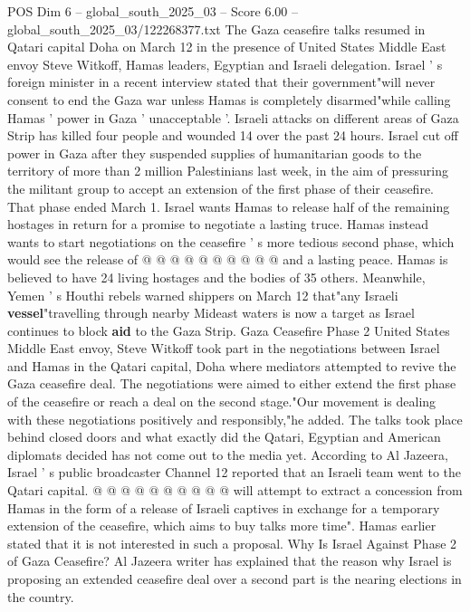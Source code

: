\begin{textsample}{POS Dim 6 – global\_south\_2025\_03 – Score 6.00 – global\_south\_2025\_03/122268377.txt}  \label{ex:f6_pos_223}
The Gaza ceasefire talks resumed in Qatari capital Doha on March 12 in the presence of United States Middle East envoy Steve Witkoff, Hamas leaders, Egyptian and Israeli delegation.
Israel ' s foreign minister in a recent interview stated that their government"will never consent to end the Gaza war unless Hamas is completely disarmed"while calling Hamas ' power in Gaza ' unacceptable '.
Israeli attacks on different areas of Gaza Strip has killed four people and wounded 14 over the past 24 hours.
Israel cut off power in Gaza after they suspended supplies of humanitarian goods to the territory of more than 2 million Palestinians last week, in the aim of pressuring the militant group to accept an extension of the first phase of their ceasefire.
That phase ended March 1.
Israel wants Hamas to release half of the remaining hostages in return for a promise to negotiate a lasting truce.
Hamas instead wants to start negotiations on the ceasefire ' s more tedious second phase, which would see the release of @ @ @ @ @ @ @ @ @ @ and a lasting peace.
Hamas is believed to have 24 living hostages and the bodies of 35 others.
Meanwhile, Yemen ' s Houthi rebels warned shippers on March 12 that"any Israeli \textbf{vessel}"travelling through nearby Mideast waters is now a target as Israel continues to block \textbf{aid} to the Gaza Strip.
Gaza Ceasefire Phase 2 United States Middle East envoy, Steve Witkoff took part in the negotiations between Israel and Hamas in the Qatari capital, Doha where mediators attempted to revive the Gaza ceasefire deal.
The negotiations were aimed to either extend the first phase of the ceasefire or reach a deal on the second stage."Our movement is dealing with these negotiations positively and responsibly,"he added.
The talks took place behind closed doors and what exactly did the Qatari, Egyptian and American diplomats decided has not come out to the media yet.
According to Al Jazeera, Israel ' s public broadcaster Channel 12 reported that an Israeli team went to the Qatari capital. @ @ @ @ @ @ @ @ @ @ will attempt to extract a concession from Hamas in the form of a release of Israeli captives in exchange for a temporary extension of the ceasefire, which aims to buy talks more time".
Hamas earlier stated that it is not interested in such a proposal.
Why Is Israel Against Phase 2 of Gaza Ceasefire?
Al Jazeera writer has explained that the reason why Israel is proposing an extended ceasefire deal over a second part is the nearing elections in the country.

\end{textsample}
